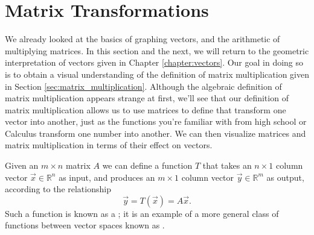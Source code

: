 \section{Matrix Transformations}\label{sec:geom_3}


We already looked at the basics of graphing vectors, and the arithmetic of multiplying matrices. In this section and the next, we will return to the geometric interpretation of vectors given in Chapter \ref{chapter:vectors}. Our goal in doing so is to obtain a visual understanding of the definition of matrix multiplication given in Section \ref{sec:matrix_multiplication}. Although the algebraic definition of matrix multiplication appears strange at first, we'll see that our definition of matrix multiplication allows us to use matrices to define  that transform one vector into another, just as the functions you're familiar with from high school or Calculus transform one number into another. We can then visualize matrices and matrix multiplication in terms of their effect on vectors.

Given an $m\times n$ matrix $A$ we can define a function $T$ that takes an $n\times 1$ column vector $\vec x\in \mathbb{R}^n$ as input, and produces an $m\times 1$ column vector $\vec y\in \mathbb{R}^m$ as output, according to the relationship
\[
\vec y = T(\vec x) = A\vec x.
\]
Such a function is known as a ; it is an example of a more general class of functions between vector spaces known as .

